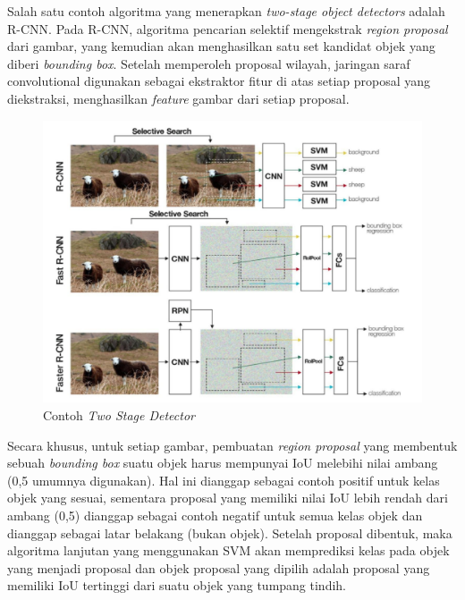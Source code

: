 Salah satu contoh algoritma yang menerapkan \textit{two-stage object detectors} adalah R-CNN. 
Pada R-CNN, algoritma pencarian selektif mengekstrak \textit{{region proposal}}
dari gambar, yang kemudian akan menghasilkan satu set kandidat objek yang diberi \textit{bounding box}. 
Setelah memperoleh proposal wilayah, jaringan saraf convolutional digunakan sebagai ekstraktor fitur 
di atas setiap proposal yang diekstraksi, menghasilkan \textit{feature} gambar dari setiap proposal. 

\begin{figure}[h!]
    \begin{center}
      \includegraphics[width= 1\linewidth]{bab2/Two stage.png}
      \caption{Contoh \textit{Two Stage Detector}}
      \label{fig: Two Stage Detector}
    \end{center}
\end{figure}

Secara khusus, untuk setiap gambar, pembuatan \textit{region proposal} yang membentuk sebuah
\textit{bounding box} suatu objek harus mempunyai IoU melebihi nilai ambang (0,5 umumnya digunakan). Hal ini 
dianggap sebagai contoh positif untuk kelas objek yang sesuai,
sementara proposal yang memiliki nilai IoU
lebih rendah dari ambang (0,5) dianggap sebagai contoh negatif untuk semua kelas objek dan dianggap 
sebagai latar belakang (bukan objek). Setelah proposal dibentuk, maka algoritma lanjutan yang menggunakan SVM akan memprediksi kelas pada
objek yang menjadi proposal dan objek proposal yang dipilih adalah proposal yang memiliki IoU tertinggi
dari suatu objek yang tumpang tindih.

